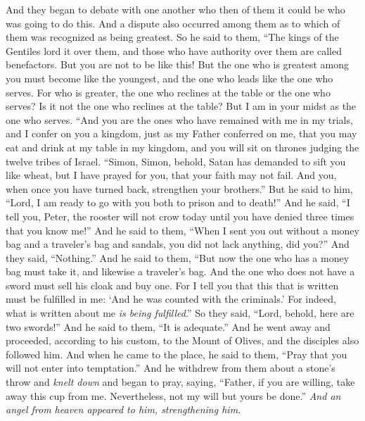 \begin{biblechapter}
\verse And they began to debate with one another who then of them it could be who was going to do this.
 And a dispute also occurred among them as to which of them was recognized as being greatest.
\verse So he said to them, “The kings of the Gentiles lord it over them, and those who have authority over them are called benefactors.
\verse But you are not to be like this! But the one who is greatest among you must become like the youngest, and the one who leads like the one who serves.
\verse For who is greater, the one who reclines at the table or the one who serves? Is it not the one who reclines at the table? But I am in your midst as the one who serves.
\verse “And you are the ones who have remained with me in my trials,
\verse and I confer on you a kingdom, just as my Father conferred on me,
\verse that you may eat and drink at my table in my kingdom, and you will sit on thrones judging the twelve tribes of Israel.
 “Simon, Simon, behold, Satan has demanded to sift you like wheat,
\verse but I have prayed for you, that your faith may not fail. And you, when once you have turned back, strengthen your brothers.”
\verse But he said to him, “Lord, I am ready to go with you both to prison and to death!”
\verse And he said, “I tell you, Peter, the rooster will not crow today until you have denied three times that you know me!”
 And he said to them, “When I sent you out without a money bag and a traveler’s bag and sandals, you did not lack anything, did you?” And they said, “Nothing.”
\verse And he said to them, “But now the one who has a money bag must take it, and likewise a traveler’s bag. And the one who does not have a sword must sell his cloak and buy one.
\verse For I tell you that this that is written must be fulfilled in me: ‘And he was counted with the criminals.’ For indeed, what is written about me \textit{is being fulfilled}.”
\verse So they said, “Lord, behold, here are two swords!” And he said to them, “It is adequate.”
 And he went away and proceeded, according to his custom, to the Mount of Olives, and the disciples also followed him.
\verse And when he came to the place, he said to them, “Pray that you will not enter into temptation.”
\verse And he withdrew from them about a stone’s throw and \textit{knelt down} and began to pray,
\verse saying, “Father, if you are willing, take away this cup from me. Nevertheless, not my will but yours be done.”
\verse \textit{And an angel from heaven appeared to him, strengthening him.
}
\end{biblechapter}
